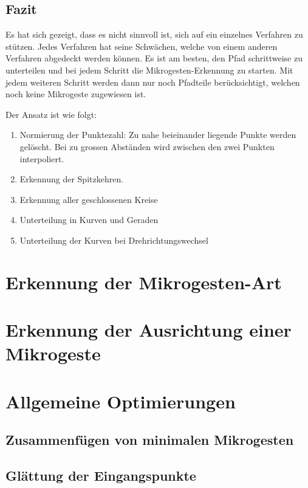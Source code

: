 \subsection{Fazit}
Es hat sich gezeigt, dass es nicht sinnvoll ist, sich auf ein einzelnes Verfahren zu stützen. Jedes Verfahren hat seine Schwächen, welche von einem anderen Verfahren abgedeckt werden können. Es ist am besten, den Pfad schrittweise zu unterteilen und bei jedem Schritt die Mikrogesten-Erkennung zu starten. Mit jedem weiteren Schritt werden dann nur noch Pfadteile berücksichtigt, welchen noch keine Mikrogeste zugewiesen ist.

Der Ansatz ist wie folgt:
\begin{enumerate}
	\item Normierung der Punktezahl: Zu nahe beieinander liegende Punkte werden gelöscht. Bei zu grossen Abständen wird zwischen den zwei Punkten interpoliert.
	\item Erkennung der Spitzkehren.
	\item Erkennung aller geschlossenen Kreise 
	\item Unterteilung in Kurven und Geraden
	\item Unterteilung der Kurven bei Drehrichtungswechsel
\end{enumerate}



\section{Erkennung der Mikrogesten-Art}


\section{Erkennung der Ausrichtung einer Mikrogeste}


\section{Allgemeine Optimierungen}


\subsection{Zusammenfügen von minimalen Mikrogesten}


\subsection{Glättung der Eingangspunkte}\label{sec:Glaettung}


